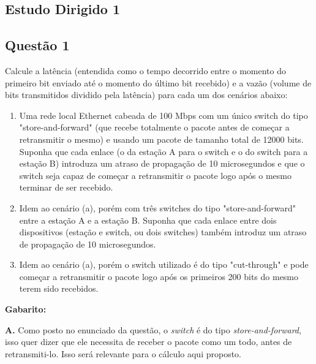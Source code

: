 \documentclass[12pt]{article}
\begin{document}
\begin{titlepage}




\section{Estudo Dirigido 1}

\subsection*{Questão 1}

Calcule a latência (entendida como o tempo decorrido entre o momento do primeiro
bit enviado até o momento do último bit recebido) e a vazão (volume de bits
transmitidos dividido pela latência) para cada um dos cenários abaixo:

\begin{enumerate}
    \item Uma rede local Ethernet cabeada de 100 Mbps com um único switch do tipo
    "store-and-forward" (que recebe totalmente o pacote antes de começar a
    retransmitir o mesmo) e usando um pacote de tamanho total de 12000 bits. Suponha
    que cada enlace (o da estação A para o switch e o do switch para a estação B)
    introduza um atraso de propagação de 10 microsegundos e que o switch seja capaz
    de começar a retransmitir o pacote logo após o mesmo terminar de ser recebido.

    \item Idem ao cenário (a), porém com três switches do tipo "store-and-forward" entre
    a estação A e a estação B. Suponha que cada enlace entre dois dispositivos (estação
    e switch, ou dois switches) também introduz um atraso de propagação de 10
    microsegundos.

    \item Idem ao cenário (a), porém o switch utilizado é do tipo "cut-through" e pode
    começar a retransmitir o pacote logo após os primeiros 200 bits do mesmo terem sido
    recebidos.
\end{enumerate}

\textbf{Gabarito:}

\textbf{A. } Como posto no enunciado da questão, o \textit{switch} é do tipo \textit{store-and-forward}, isso quer dizer que ele necessita de receber o pacote como um todo, antes de retransmiti-lo. Isso será relevante para o cálculo aqui proposto.


\end{titlepage}
\end{document}

